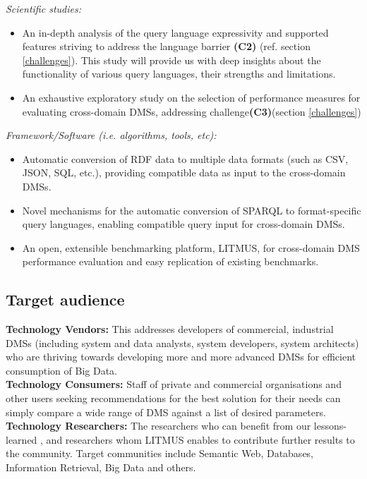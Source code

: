 \documentclass{llncs}
\begin{document}
    \textit{Scientific studies:} 
        \begin{itemize}[nosep]
            \item An in-depth analysis of the query language expressivity and supported features striving to address the language barrier \textbf{(C2)} (ref. section \ref{challenges}). This study will provide us with deep insights about the functionality of various query languages, their strengths and limitations.
            \item An exhaustive exploratory study on the selection of performance measures for evaluating cross-domain DMSs, addressing challenge\textbf{(C3)}(section \ref{challenges})
        \end{itemize}
        
         \textit{Framework/Software (i.e. algorithms, tools, etc):} 
        \begin{itemize}[nosep]
            \item Automatic conversion of RDF data to multiple data formats (such as CSV, JSON, SQL, etc.), providing compatible data as input to the cross-domain DMSs. 
            \item Novel mechanisms for the automatic conversion of SPARQL to format-specific query languages, enabling compatible query input for cross-domain DMSs.
            \item An open, extensible benchmarking platform, LITMUS, for cross-domain DMS performance evaluation and easy replication of existing benchmarks.
       \end{itemize}       

    \subsection{Target audience}
            \textbf{Technology Vendors:}
            This addresses developers of commercial, industrial DMSs (including system and data analysts, system developers, system architects) who are thriving towards developing more and more advanced DMSs for efficient consumption of Big Data.\\
            \textbf{Technology Consumers:}
            Staff of private and commercial organisations and other users seeking recommendations for the best solution for their needs can simply compare a wide range of DMS against a list of desired parameters. \\
            \textbf{Technology Researchers:}
            The researchers who can benefit from our lessons-learned , and researchers whom LITMUS enables to contribute further results to the community.
            Target communities include Semantic Web, Databases, Information Retrieval, Big Data and others.
\end{document}
